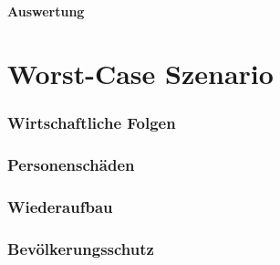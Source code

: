 \subsection{Auswertung}
 
\newpage
\newpage

\part{Worst-Case Szenario}
\section{Wirtschaftliche Folgen}
\newpage
\section{Personenschäden}
\newpage
\section{Wiederaufbau}
\newpage
\section{Bevölkerungsschutz}


 